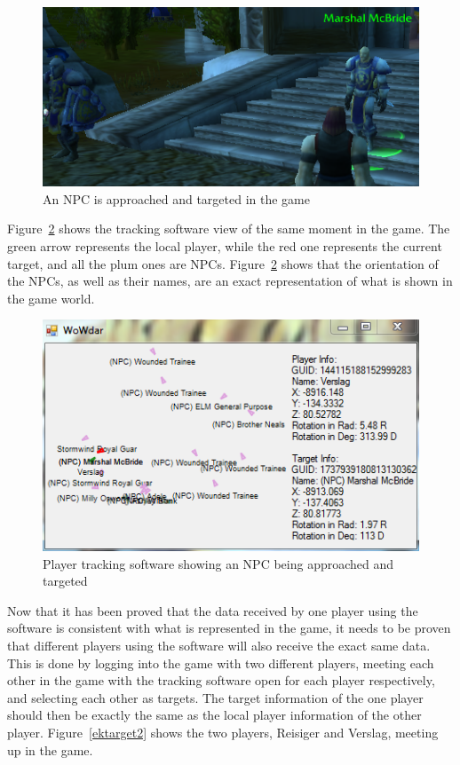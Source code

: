 \begin{figure}[htbp]
\centering
\includegraphics[scale = 0.75]{target11.png}	
\caption{An NPC is approached and targeted in the game}
\label{target1}
\end{figure}

Figure~\ref{target2} shows the tracking software view of the same moment in the game. The green arrow represents the local player, while the red one represents the current target, and all the plum ones are NPCs. Figure~\ref{target2} shows that the orientation of the NPCs, as well as their names, are an exact representation of what is shown in the game world.

\begin{figure}[htbp]
\centering
\includegraphics[scale = 0.8]{target12.png}	
\caption{Player tracking software showing an NPC being approached and targeted}
\label{target2}
\end{figure}

Now that it has been proved that the data received by one player using the software is consistent with what is represented in the game, it needs to be proven that different players using the software will also receive the exact same data. This is done by logging into the game with two different players, meeting each other in the game with the tracking software open for each player respectively, and selecting each other as targets. The target information of the one player should then be exactly the same as the local player information of the other player. Figure~\ref{ektarget2} shows the two players, Reisiger and Verslag,  meeting up in the game. 

